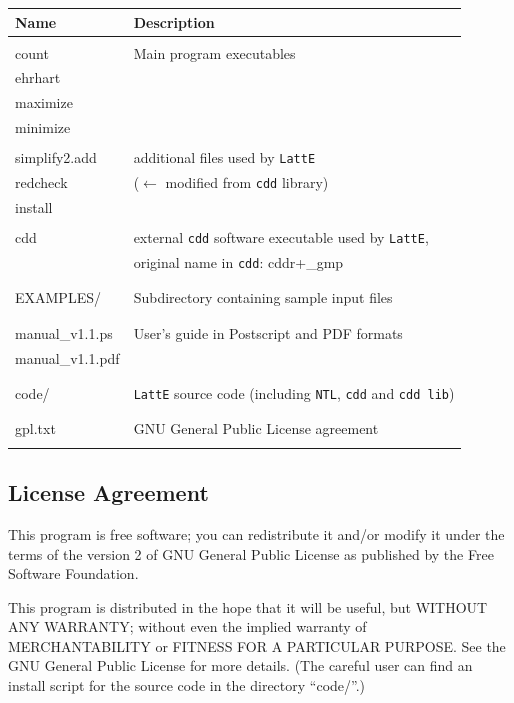 \documentclass{article}
\begin{document}
\begin{tabular}{|l|l|}
\hline
Name & Description\\
\hline 
& \\
count & Main program executables\\
ehrhart & \\
maximize & \\
minimize & \\
& \\

simplify2.add & additional files used by {\tt LattE}\\
redcheck & ($\leftarrow$ modified from {\tt cdd} library) \\
install & \\
& \\
cdd & external {\tt cdd} software executable used by {\tt LattE},\\
& original name in {\tt cdd}: cddr+\_gmp\\
& \\
\hline
& \\
EXAMPLES/ & Subdirectory containing sample input files\\
& \\
\hline
& \\
manual\_v1.1.ps & User's guide in Postscript and PDF formats\\
manual\_v1.1.pdf & \\
& \\
\hline 
& \\
code/ & {\tt LattE} source code (including {\tt NTL}, {\tt cdd} and {\tt cdd lib})\\
& \\
\hline 
& \\
gpl.txt & GNU General Public License agreement\\
& \\
\hline 
\end{tabular}

\subsection{License Agreement}

This program is free software; you can redistribute it and/or
modify it under the terms of the version 2 of GNU General Public
License as published by the Free Software Foundation.

This program is distributed in the hope that it will be useful,
but WITHOUT ANY WARRANTY; without even the implied warranty of
MERCHANTABILITY or FITNESS FOR A PARTICULAR PURPOSE. See the GNU
General Public License for more details. (The careful user can find
an install script for the source code in the directory ``code/''.)
\end{document}
